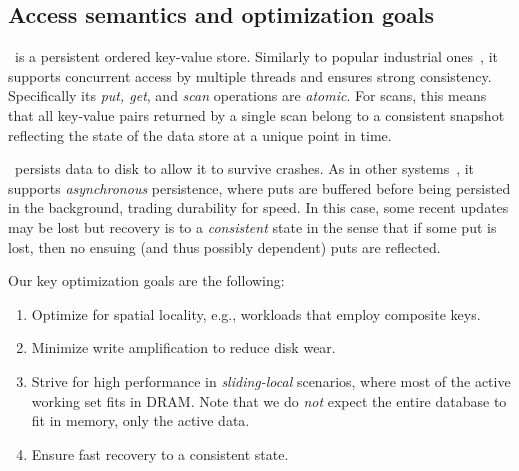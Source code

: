 
\subsection{Access semantics and optimization goals}
\sys\ is a persistent ordered key-value store. Similarly to popular industrial ones~\cite{hbase,leveldb,RocksDB}, 
it supports concurrent access by multiple threads and ensures strong consistency. 
Specifically its \emph{put, get}, and \emph{scan} operations are \emph{atomic}.  
For scans, this means that all key-value pairs returned by a single scan belong to a consistent 
snapshot reflecting the state of the data store at a unique point in time.

\sys\ persists data to disk to allow it to survive crashes.
As in other systems~\cite{leveldb,RocksDB},  it supports
\emph{asynchronous} persistence, where puts are buffered before being persisted in the background,  
 trading durability for speed. In this case, some recent updates may be lost but 
 recovery is to a \emph{consistent} state  in the sense that 
if some put is lost, then no ensuing (and thus possibly dependent) puts are reflected.



Our key optimization goals are the following:
\begin{enumerate}
\item Optimize for {spatial locality}, e.g., workloads that employ composite keys.
 
\item Minimize {write amplification}  to reduce disk wear.%
 
\item %
Strive for high performance in  \emph{sliding-local} scenarios, where most of the active working set fits in DRAM. 
Note that we do \emph{not} expect the entire database to fit in
memory, only the active data.  
 
\item Ensure {fast recovery} to a consistent state.  
\end{enumerate}

